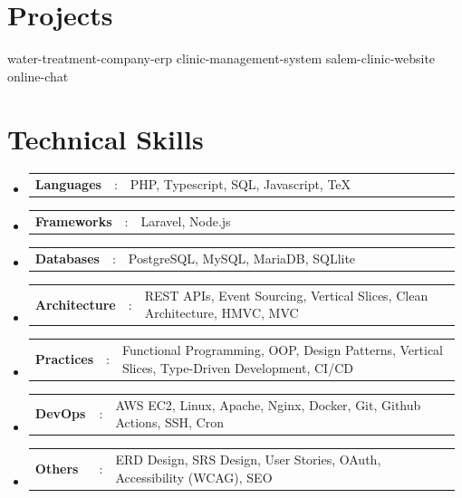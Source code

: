 \documentclass[a4paper,11pt]{article}
\newcommand{\resumeItem}[1]{
  \item\small{#1}
}
\newcommand{\resumeItemListStart}{\begin{itemize}[rightmargin=0.11in]}
\newcommand{\resumeItemListEnd}{\end{itemize}}
\newcommand{\resumeSectionType}[3]{
  \item\begin{tabular*}{0.96\textwidth}[t]{
    p{0.15\linewidth}p{0.02\linewidth}p{0.81\linewidth}
  }
    \textbf{#1} & #2 & #3
  \end{tabular*}\vspace{-2pt}
}
\newcommand{\resumeHeadingListStart}{
  \begin{itemize}[leftmargin=0.15in, label={}]
}
\newcommand{\resumeHeadingListEnd}{\end{itemize}}
\begin{document}

\section{Projects}
  \resumeHeadingListStart{}
    {water-treatment-company-erp}
    {clinic-management-system}
    {salem-clinic-website}
    {online-chat}
  \resumeHeadingListEnd{}


\section{Technical Skills}
  \resumeHeadingListStart{}
    \resumeSectionType{Languages}{:}{PHP, Typescript, SQL, Javascript, TeX}
    \resumeSectionType{Frameworks}{:}{Laravel, Node.js}
    \resumeSectionType{Databases}{:}{PostgreSQL, MySQL, MariaDB, SQLlite}
    \resumeSectionType{Architecture}{:}{REST APIs, Event Sourcing, Vertical Slices, Clean Architecture, HMVC, MVC}
    \resumeSectionType{Practices}{:}{Functional Programming, OOP, Design Patterns, Vertical Slices, Type-Driven Development, CI/CD}
    \resumeSectionType{DevOps}{:}{AWS EC2, Linux, Apache, Nginx, Docker, Git, Github Actions, SSH, Cron}
    \resumeSectionType{Others}{:}{ERD Design, SRS Design, User Stories, OAuth, Accessibility (WCAG), SEO}
  \resumeHeadingListEnd{}


\end{document}
